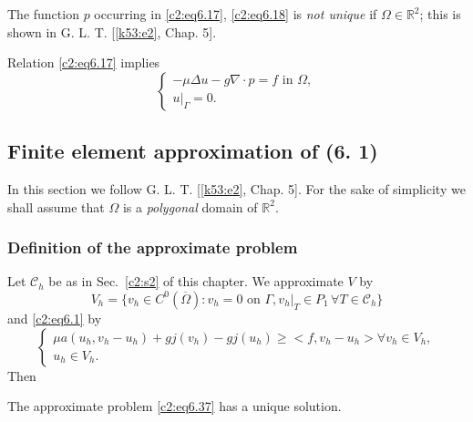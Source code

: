 \begin{remark}\label{c2:rem6.3}%
The function $p$ occurring in \eqref{c2:eq6.17}, \eqref{c2:eq6.18} is {\em not
  unique} if $\Omega \in \mathbb{R}^2$; this is shown in
G. L. T. [\ref{k53:e2}, Chap. 5]. 
\end{remark}

\begin{remark}\label{c2:rem6.4}%
Relation \eqref{c2:eq6.17} implies 
\begin{equation}
\begin{cases}
- \mu \Delta u - g  \nabla \cdot p = f \text{ in } \Omega,\\ 
u |_\Gamma = 0 .
\end{cases}
\tag{6.36}\label{c2:eq6.36}
\end{equation}
\end{remark}

\subsection{Finite element approximation of
  (6. 1)}\label{c2:ss6.7}%

In this section we follow G. L. T. [\ref{k53:e2}, Chap. 5]. For the sake of
simplicity we shall assume that $\Omega$ is a \textit{ polygonal }
domain of $\mathbb{R}^2$. 

\subsubsection{Definition of the approximate problem}\label{c2:sss6.7.1} 

Let
$\mathscr{C}_h$ be as in Sec.~\ref{c2:s2} of this chapter. We
approximate $V$ by    
$$
V_h = \{ v_h \in C^0 (\overline{\Omega}) : v_h = 0 \text{ on }
\Gamma, v_h |_T \in P_1\, \forall  T \in \mathscr{C}_h \} 
$$
and \eqref{c2:eq6.1} by 
\begin{equation}
\begin{cases}
\mu a (u_h, v_h - u_h) + gj (v_h) - gj (u_h) \geq <f, v_h - u_h>
\forall v_h \in V_h,\\ 
u_h \in V_h.
\end{cases}
\tag{6.37}\label{c2:eq6.37}
\end{equation}\pageoriginale 
Then 

\begin{theorem}\label{c2:thm6.4}%
The approximate problem \eqref{c2:eq6.37} has a unique solution. 
\end{theorem}

